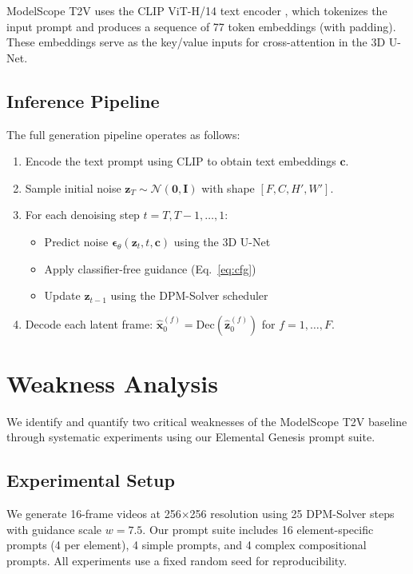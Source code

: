 \documentclass[conference]{IEEEtran}
\begin{document}
ModelScope T2V uses the CLIP ViT-H/14 text encoder \cite{radford2021clip}, which tokenizes the input prompt and produces a sequence of 77 token embeddings (with padding). These embeddings serve as the key/value inputs for cross-attention in the 3D U-Net.

\subsection{Inference Pipeline}

The full generation pipeline operates as follows:
\begin{enumerate}
    \item Encode the text prompt using CLIP to obtain text embeddings $\mathbf{c}$.
    \item Sample initial noise $\mathbf{z}_T \sim \mathcal{N}(\mathbf{0}, \mathbf{I})$ with shape $[F, C, H', W']$.
    \item For each denoising step $t = T, T-1, \ldots, 1$:
    \begin{itemize}
        \item Predict noise $\boldsymbol{\epsilon}_\theta(\mathbf{z}_t, t, \mathbf{c})$ using the 3D U-Net
        \item Apply classifier-free guidance (Eq.~\ref{eq:cfg})
        \item Update $\mathbf{z}_{t-1}$ using the DPM-Solver scheduler
    \end{itemize}
    \item Decode each latent frame: $\hat{\mathbf{x}}_0^{(f)} = \text{Dec}(\hat{\mathbf{z}}_0^{(f)})$ for $f = 1, \ldots, F$.
\end{enumerate}

\section{Weakness Analysis}

We identify and quantify two critical weaknesses of the ModelScope T2V baseline through systematic experiments using our Elemental Genesis prompt suite.

\subsection{Experimental Setup}

We generate 16-frame videos at 256$\times$256 resolution using 25 DPM-Solver steps with guidance scale $w = 7.5$. Our prompt suite includes 16 element-specific prompts (4 per element), 4 simple prompts, and 4 complex compositional prompts. All experiments use a fixed random seed for reproducibility.
\end{document}
